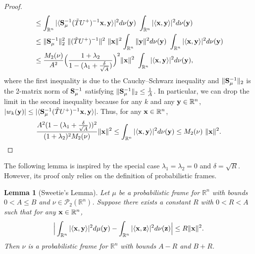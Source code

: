 \documentclass{amsart}
\numberwithin{equation}{section}
\theoremstyle{plain}
\newtheorem{lemma}[theorem]{Lemma}
\theoremstyle{definition}
\begin{document}
\begin{proof}
\begin{equation*}
\begin{split}
   & \leq \int_{\mathbb{R}^n} |\langle {\bf S}_{\mu}^{-1}(\Tilde{T}U^{+})^{-1}{\bf x}, {\bf y} \rangle|^2 d\nu({\bf y})  \ \int_{\mathbb{R}^n} |\langle {\bf x}, {\bf y} \rangle|^2 d\nu({\bf y})\\
  &\leq \Vert {\bf S}_{\mu}^{-1} \Vert_2^2 \ \Vert(\Tilde{T}U^{+})^{-1} \Vert^2 \ \Vert {\bf x} \Vert^2  \int_{\mathbb{R}^n} \Vert {\bf y} \Vert^2 d\nu({\bf y})  \ \int_{\mathbb{R}^n} |\langle {\bf x}, {\bf y} \rangle|^2 d\nu({\bf y})\\
   &\leq \frac{M_2(\nu)}{A^2} \Big (\frac{1+\lambda_2}{1- (\lambda_1 + \frac{\delta}{\sqrt{A}})} \Big)^2   \Vert {\bf x} \Vert^2  \ \int_{\mathbb{R}^n} |\langle {\bf x}, {\bf y} \rangle|^2 d\nu({\bf y}),
\end{split}
\end{equation*}
where the first inequality is due to the Cauchy–Schwarz inequality and $\Vert {\bf S}_{\mu}^{-1} \Vert_2$ is the 2-matrix norm of ${\bf S}_{\mu}^{-1}$ satisfying $ \Vert {\bf S}_{\mu}^{-1} \Vert_2 \leq \frac{1}{A}$. In particular, we can drop the limit in the second inequality because for any $k$ and any ${\bf y} \in \mathbb{R}^n$,  $|w_k({\bf y})| \leq |\langle {\bf S}_{\mu}^{-1}(\Tilde{T}U^{+})^{-1}{\bf x}, {\bf y} \rangle|$.
Thus, for any ${\bf x} \in \mathbb{R}^n$, 
\begin{equation*}
   \frac{ A^2(1-(\lambda_1 + \frac{\delta}{\sqrt{A}}))^2}{(1+\lambda_2)^2 M_2(\nu)} \Vert  {\bf x} \Vert^2  \leq \int_{\mathbb{R}^n} |\langle {\bf x}, {\bf y} \rangle|^2 d\nu({\bf y}) \leq M_2(\nu) \ \Vert  {\bf x} \Vert^2. \qedhere
\end{equation*}
\end{proof}

    
The following lemma is inspired by the special case $\lambda_1=\lambda_2=0$ and $\delta=\sqrt{R}$. However, its proof only relies on the definition of probabilistic frames.

\begin{lemma}[Sweetie's Lemma]\label{sweetie}
Let $\mu$ be a probabilistic frame for $\mathbb{R}^n$ with bounds $0<A\leq B$ and $\nu \in \mathcal{P}_2(\mathbb{R}^n)$. Suppose there exists a constant $R$ with $ 0<R < A$ such that for any ${\bf x} \in \mathbb{R}^n$, 
    \begin{equation*}
     \Big   \vert \int_{\mathbb{R}^n} |\langle {\bf x}, {\bf y} \rangle|^2 d\mu({\bf y}) - \int_{\mathbb{R}^n} |\langle {\bf x}, {\bf z} \rangle|^2  d\nu({\bf z}) \Big \vert \leq R    \Vert  {\bf x} \Vert^2. 
    \end{equation*}
Then $\nu$ is a probabilistic frame for $\mathbb{R}^n$ with bounds $A-R$ and $B+R$. 
\end{lemma}
\end{document}
